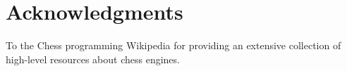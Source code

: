 
\chapter*{Acknowledgments}

To the Chess programming Wikipedia for providing an extensive collection of high-level resources about chess engines.










